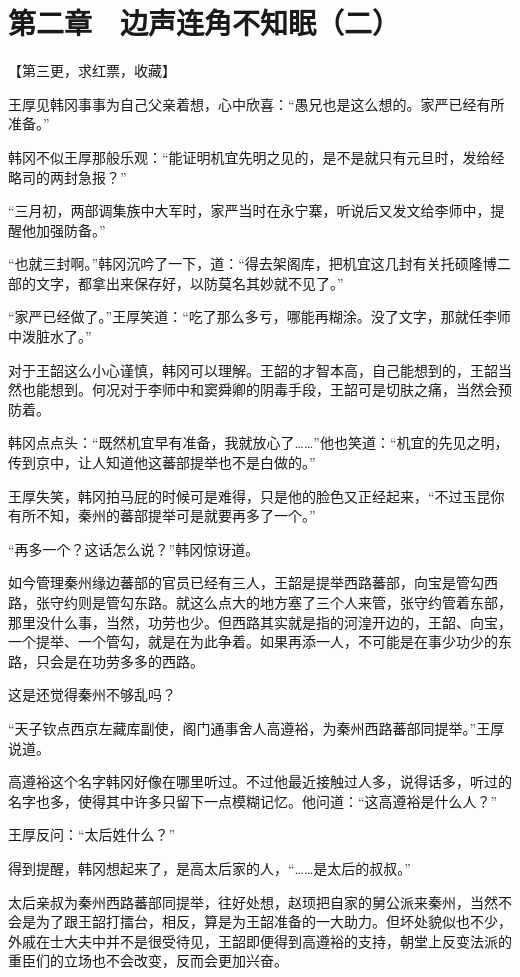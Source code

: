 \section{第二章　边声连角不知眠（二）}

【第三更，求红票，收藏】

王厚见韩冈事事为自己父亲着想，心中欣喜：“愚兄也是这么想的。家严已经有所准备。”

韩冈不似王厚那般乐观：“能证明机宜先明之见的，是不是就只有元旦时，发给经略司的两封急报？”

“三月初，两部调集族中大军时，家严当时在永宁寨，听说后又发文给李师中，提醒他加强防备。”

“也就三封啊。”韩冈沉吟了一下，道：“得去架阁库，把机宜这几封有关托硕隆博二部的文字，都拿出来保存好，以防莫名其妙就不见了。”

“家严已经做了。”王厚笑道：“吃了那么多亏，哪能再糊涂。没了文字，那就任李师中泼脏水了。”

对于王韶这么小心谨慎，韩冈可以理解。王韶的才智本高，自己能想到的，王韶当然也能想到。何况对于李师中和窦舜卿的阴毒手段，王韶可是切肤之痛，当然会预防着。

韩冈点点头：“既然机宜早有准备，我就放心了……”他也笑道：“机宜的先见之明，传到京中，让人知道他这蕃部提举也不是白做的。”

王厚失笑，韩冈拍马屁的时候可是难得，只是他的脸色又正经起来，“不过玉昆你有所不知，秦州的蕃部提举可是就要再多了一个。”

“再多一个？这话怎么说？”韩冈惊讶道。

如今管理秦州缘边蕃部的官员已经有三人，王韶是提举西路蕃部，向宝是管勾西路，张守约则是管勾东路。就这么点大的地方塞了三个人来管，张守约管着东部，那里没什么事，当然，功劳也少。但西路其实就是指的河湟开边的，王韶、向宝，一个提举、一个管勾，就是在为此争着。如果再添一人，不可能是在事少功少的东路，只会是在功劳多多的西路。

这是还觉得秦州不够乱吗？

“天子钦点西京左藏库副使，阁门通事舍人高遵裕，为秦州西路蕃部同提举。”王厚说道。

高遵裕这个名字韩冈好像在哪里听过。不过他最近接触过人多，说得话多，听过的名字也多，使得其中许多只留下一点模糊记忆。他问道：“这高遵裕是什么人？”

王厚反问：“太后姓什么？”

得到提醒，韩冈想起来了，是高太后家的人，“……是太后的叔叔。”

太后亲叔为秦州西路蕃部同提举，往好处想，赵顼把自家的舅公派来秦州，当然不会是为了跟王韶打擂台，相反，算是为王韶准备的一大助力。但坏处貌似也不少，外戚在士大夫中并不是很受待见，王韶即便得到高遵裕的支持，朝堂上反变法派的重臣们的立场也不会改变，反而会更加兴奋。


